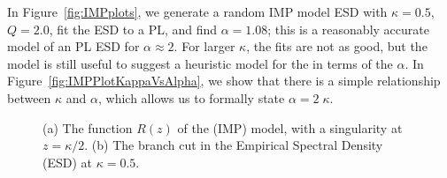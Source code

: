 In Figure~\ref{fig:IMPplots}, we generate a random IMP model ESD with $\kappa=0.5$, $Q=2.0$, fit the ESD
to a PL, and find $\alpha=1.08$; this is a reasonably accurate model of an PL ESD for $\alpha\approx 2$.
For larger $\kappa$, the fits are not as good, but the model is still useful to suggest a heuristic model for the
\LayerQuality in terms of the \HTSR $\alpha$.
In Figure~\ref{fig:IMPPlotKappaVsAlpha}, we show that there is a simple relationship between $\kappa$ and $\alpha$,
which allows us to formally state $\alpha=2\;\kappa$.

\begin{figure}[t]
    \centering
    \caption{(a) The function $R(z)$ of the \InverseMP (IMP) model, with a singularity at $z = \kappa/2$. (b) The branch cut in the Empirical Spectral Density (ESD) at $\kappa = 0.5$.}
    \label{fig:R_branch_cut_combined}
\end{figure}

